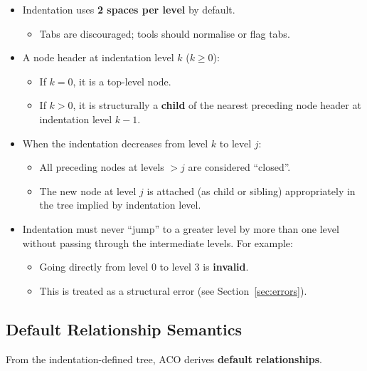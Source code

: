 \documentclass[11pt]{article}
\begin{document}
\begin{itemize}[leftmargin=2em]
  \item Indentation uses \textbf{2 spaces per level} by default.
  \begin{itemize}[leftmargin=1.5em]
    \item Tabs are discouraged; tools should normalise or flag tabs.
  \end{itemize}

  \item A node header at indentation level \(k\) (\(k \geq 0\)):
  \begin{itemize}[leftmargin=1.5em]
    \item If \(k = 0\), it is a top-level node.
    \item If \(k > 0\), it is structurally a \textbf{child} of the nearest preceding node header at indentation level \(k - 1\).
  \end{itemize}

  \item When the indentation decreases from level \(k\) to level \(j\):
  \begin{itemize}[leftmargin=1.5em]
    \item All preceding nodes at levels \(> j\) are considered ``closed''.
    \item The new node at level \(j\) is attached (as child or sibling) appropriately in the tree implied by indentation level.
  \end{itemize}

  \item Indentation must never ``jump'' to a greater level by more than one level without passing through the intermediate levels. For example:
  \begin{itemize}[leftmargin=1.5em]
    \item Going directly from level 0 to level 3 is \textbf{invalid}.
    \item This is treated as a structural error (see Section~\ref{sec:errors}).
  \end{itemize}
\end{itemize}

\subsection{Default Relationship Semantics}

From the indentation-defined tree, ACO derives \textbf{default relationships}.
\end{document}
